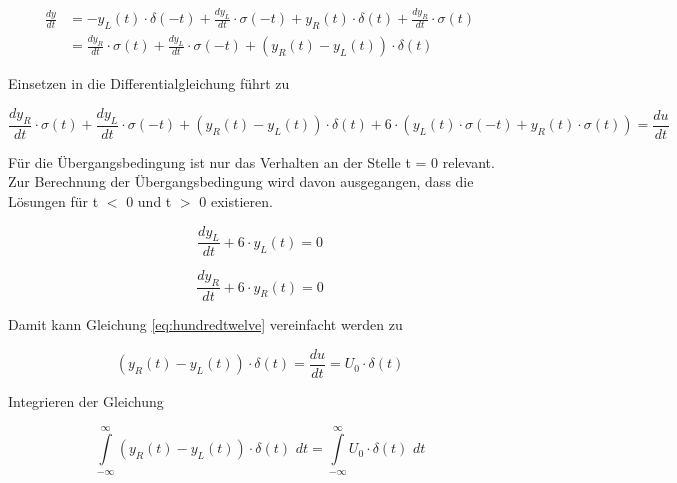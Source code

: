 \begin{equation}\label{eq:hundredeleven}
\begin{split}
\frac{dy}{dt}  & = -y_{L} \left(t\right)\cdot \delta \left(-t\right)+\frac{dy_{L} }{dt} \cdot \sigma \left(-t\right)+y_{R} \left(t\right)\cdot \delta \left(t\right)+\frac{dy_{R} }{dt} \cdot \sigma \left(t\right) \\ 
& = \frac{dy_{R} }{dt} \cdot \sigma \left(t\right)+\frac{dy_{L} }{dt} \cdot \sigma \left(-t\right)+\left(y_{R} \left(t\right)-y_{L} \left(t\right)\right)\cdot \delta \left(t\right)  
\end{split}
\end{equation}

\noindent Einsetzen in die Differentialgleichung führt zu

\begin{equation}\label{eq:hundredtwelve}
\frac{dy_{R} }{dt} \cdot \sigma \left(t\right)+\frac{dy_{L} }{dt} \cdot \sigma \left(-t\right)+\left(y_{R} \left(t\right)-y_{L} \left(t\right)\right)\cdot \delta \left(t\right)+6\cdot \left(y_{L} \left(t\right)\cdot \sigma \left(-t\right)+y_{R} \left(t\right)\cdot \sigma \left(t\right)\right)=\frac{du}{dt}
\end{equation}

\noindent F\"{u}r die \"{U}bergangsbedingung ist nur das Verhalten an der Stelle t = 0 relevant. Zur Berechnung der \"{U}bergangsbedingung wird davon ausgegangen, dass die L\"{o}sungen f\"{u}r t $\mathrm{<}$ 0 und t $\mathrm{>}$ 0 existieren.

\begin{equation}\label{eq:hundredthirteen}
\frac{dy_{L} }{dt} +6\cdot y_{L} \left(t\right)=0
\end{equation}

\begin{equation}\label{eq:hundredfourteen}
\frac{dy_{R} }{dt} +6\cdot y_{R} \left(t\right)=0
\end{equation}

\noindent Damit kann Gleichung \eqref{eq:hundredtwelve} vereinfacht werden zu

\begin{equation}\label{eq:hundredfifteen}
\left(y_{R} \left(t\right)-y_{L} \left(t\right)\right)\cdot \delta \left(t\right)=\frac{du}{dt} =U_{0} \cdot \delta \left(t\right)
\end{equation}

\noindent Integrieren der Gleichung 

\begin{equation}\label{eq:hundredsixteen}
\int\limits _{-\infty }^{\infty }\left(y_{R} \left(t\right)-y_{L} \left(t\right)\right)\cdot \delta \left(t\right)\, \, dt =\int\limits _{-\infty }^{\infty }U_{0} \cdot \delta \left(t\right)\, \, dt
\end{equation}

